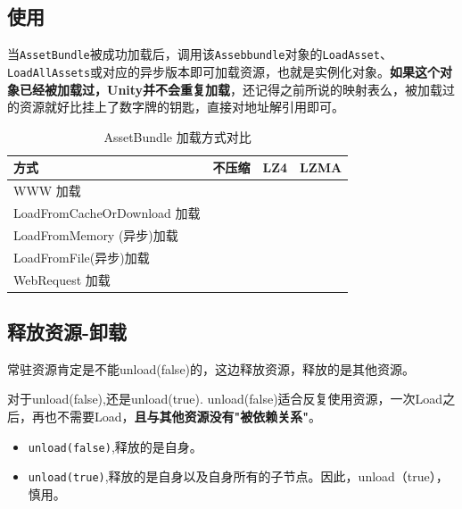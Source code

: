 \documentclass[UTF8,a4paper,12pt]{ctexbook}
\begin{document}
		\subsection{使用}
			当\verb|AssetBundle|被成功加载后，调用该\verb|Assebbundle|对象的\verb|LoadAsset|、\verb|LoadAllAssets|或对应的异步版本即可加载资源，也就是实例化对象。\textbf{如果这个对象已经被加载过，Unity并不会重复加载}，还记得之前所说的映射表么，被加载过的资源就好比挂上了数字牌的钥匙，直接对地址解引用即可。
			
			\begin{table}
				\centering
				\caption{AssetBundle 加载方式对比}
				\begin{tabular}{p{5cm}<{\centering}|p{3cm}<{\centering}|p{3cm}<{\centering}|p{3cm}<{\centering}}
					\toprule
						方式 & 不压缩 & LZ4 & LZMA\\
					\midrule
						WWW 加载 & & & \\
						LoadFromCacheOrDownload 加载 & & & \\
						LoadFromMemory (异步)加载 & & & \\
						LoadFromFile(异步)加载 & & & \\
						WebRequest 加载 & & & \\
					\bottomrule
				\end{tabular}
			\end{table}
		\subsection{释放资源-卸载}
			常驻资源肯定是不能unload(false)的，这边释放资源，释放的是其他资源。
			
			对于unload(false),还是unload(true). unload(false)适合反复使用资源，一次Load之后，再也不需要Load，\textbf{且与其他资源没有"被依赖关系"}。
			
			\begin{itemize}
				\item \verb|unload(false)|,释放的是自身。
				\item \verb|unload(true)|,释放的是自身以及自身所有的子节点。因此，unload（true），慎用。
			\end{itemize}
		
\end{document}
